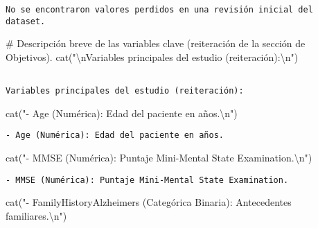 \documentclass[
  letterpaper,
  DIV=11,
  numbers=noendperiod]{scrartcl}
\newenvironment{Shaded}{\begin{snugshade}}{\end{snugshade}}
\newcommand{\CommentTok}[1]{\textcolor[rgb]{0.37,0.37,0.37}{#1}}
\newcommand{\FunctionTok}[1]{\textcolor[rgb]{0.28,0.35,0.67}{#1}}
\newcommand{\NormalTok}[1]{\textcolor[rgb]{0.00,0.23,0.31}{#1}}
\newcommand{\SpecialCharTok}[1]{\textcolor[rgb]{0.37,0.37,0.37}{#1}}
\newcommand{\StringTok}[1]{\textcolor[rgb]{0.13,0.47,0.30}{#1}}
\begin{document}
\begin{verbatim}
No se encontraron valores perdidos en una revisión inicial del dataset.
\end{verbatim}

\begin{Shaded}
\begin{Highlighting}[]
\CommentTok{\# Descripción breve de las variables clave (reiteración de la sección de Objetivos).}
\FunctionTok{cat}\NormalTok{(}\StringTok{"}\SpecialCharTok{\textbackslash{}n}\StringTok{Variables principales del estudio (reiteración):}\SpecialCharTok{\textbackslash{}n}\StringTok{"}\NormalTok{)}
\end{Highlighting}
\end{Shaded}

\begin{verbatim}

Variables principales del estudio (reiteración):
\end{verbatim}

\begin{Shaded}
\begin{Highlighting}[]
\FunctionTok{cat}\NormalTok{(}\StringTok{"{-} Age (Numérica): Edad del paciente en años.}\SpecialCharTok{\textbackslash{}n}\StringTok{"}\NormalTok{)}
\end{Highlighting}
\end{Shaded}

\begin{verbatim}
- Age (Numérica): Edad del paciente en años.
\end{verbatim}

\begin{Shaded}
\begin{Highlighting}[]
\FunctionTok{cat}\NormalTok{(}\StringTok{"{-} MMSE (Numérica): Puntaje Mini{-}Mental State Examination.}\SpecialCharTok{\textbackslash{}n}\StringTok{"}\NormalTok{)}
\end{Highlighting}
\end{Shaded}

\begin{verbatim}
- MMSE (Numérica): Puntaje Mini-Mental State Examination.
\end{verbatim}

\begin{Shaded}
\begin{Highlighting}[]
\FunctionTok{cat}\NormalTok{(}\StringTok{"{-} FamilyHistoryAlzheimers (Categórica Binaria): Antecedentes familiares.}\SpecialCharTok{\textbackslash{}n}\StringTok{"}\NormalTok{)}
\end{Highlighting}
\end{Shaded}
\end{document}
